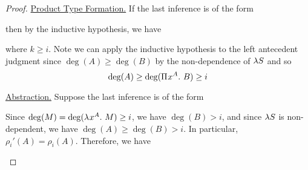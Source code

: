 \documentclass{article}
\begin{document}
\begin{proof}
\noindent\underline{Product Type Formation.}
If the last inference is of the form
\begin{prooftree}
\end{prooftree}
then by the inductive hypothesis, we have
\begin{prooftree}
\end{prooftree}
where $k \geq i$.
Note we can apply the inductive hypothesis to the left antecedent judgment since $\deg (A) \geq \deg(B)$ by the non-dependence of $\lS$ and so
\[
    \deg (A) \geq \deg(\PiT x A B) \geq i
\]

\noindent\underline{Abstraction.}
Suppose the last inference is of the form
\begin{prooftree}
\end{prooftree}
Since $\deg(M) = \deg(\lambdaT x A M) \geq i$, we have $\deg(B) > i$, and since $\lS$ is non-dependent, we have $\deg (A) \geq \deg(B) > i$.
In particular, $\rho_i'(A) = \rho_i(A)$.
Therefore, we have
\begin{prooftree}
\end{prooftree}


\end{proof}
\end{document}
